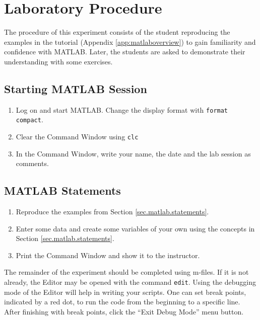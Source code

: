 \section{Laboratory Procedure}
The procedure of this experiment consists of the student reproducing the examples in the tutorial (Appendix \ref{app:matlaboverview}) to gain familiarity and confidence with MATLAB.  Later, the students are asked to demonstrate their understanding with some exercises.

\subsection{Starting MATLAB Session}
\begin{enumerate}
    \item Log on and start MATLAB.  Change the display format with \verb=format compact=.
    \item Clear the Command Window using \verb=clc=
    \item In the Command Window, write your name, the date and the lab session as comments.
\end{enumerate}

\subsection{MATLAB Statements}
\begin{enumerate}
    \item Reproduce the examples from Section \ref{sec.matlab.statements}.
    \item Enter some data and create some variables of your own using the concepts in Section \nolinebreak[3] \ref{sec.matlab.statements}.
    \item Print the Command Window and show it to the instructor.
\end{enumerate}

The remainder of the experiment should be completed using m-files.  If it is not already, the Editor may be opened with the command \verb=edit=.  Using the debugging mode of the Editor will help in writing your scripts.  One can set break points, indicated by a red dot, to run the code from the beginning to a specific line.  After finishing with break points, click the ``Exit Debug Mode'' menu button.

